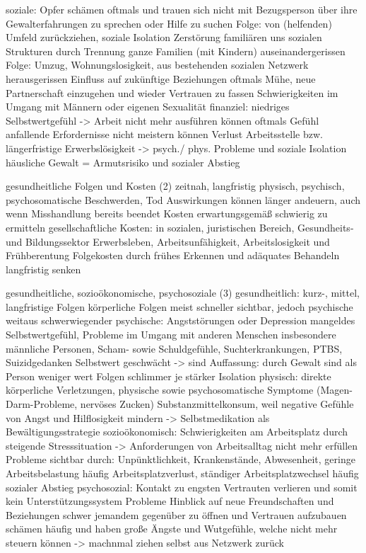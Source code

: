 soziale:
    Opfer schämen oftmals und trauen sich nicht mit Bezugsperson über ihre Gewalterfahrungen zu sprechen oder Hilfe zu suchen
    Folge: von (helfenden) Umfeld zurückziehen, soziale Isolation
    Zerstörung familiären uns sozialen Strukturen
    durch Trennung ganze Familien (mit Kindern) auseinandergerissen
    Folge: Umzug, Wohnungslosigkeit, aus bestehenden sozialen Netzwerk herausgerissen
    Einfluss auf zukünftige Beziehungen
    oftmals Mühe, neue Partnerschaft einzugehen und wieder Vertrauen zu fassen
    Schwierigkeiten im Umgang mit Männern oder eigenen Sexualität
finanziel:
    niedriges Selbstwertgefühl -> Arbeit nicht mehr ausführen können
    oftmals Gefühl anfallende Erfordernisse nicht meistern können
    Verlust Arbeitsstelle bzw. längerfristige Erwerbslösigkeit -> psych./ phys. Probleme und soziale Isolation
    häusliche Gewalt = Armutsrisiko und sozialer Abstieg

gesundheitliche Folgen und Kosten (2)
\parencite{Def_haus_Gewalt}
zeitnah, langfristig
physisch, psychisch, psychosomatische Beschwerden, Tod
Auswirkungen können länger andeuern, auch wenn Misshandlung bereits beendet
Kosten erwartungsgemäß schwierig zu ermitteln
gesellschaftliche Kosten: in sozialen, juristischen Bereich, Gesundheits- und Bildungssektor
Erwerbsleben, Arbeitsunfähigkeit, Arbeitslosigkeit und Frühberentung
Folgekosten durch frühes Erkennen und adäquates Behandeln langfristig senken

gesundheitliche, sozioökonomische, psychosoziale (3)
\parencite{Def_haus_Gewalt_2}
gesundheitlich:
    kurz-, mittel, langfristige Folgen
    körperliche Folgen meist schneller sichtbar, jedoch psychische weitaus schwerwiegender
psychische:
    Angststörungen oder Depression
    mangeldes Selbstwertgefühl, Probleme im Umgang mit anderen Menschen insbesondere männliche Personen, Scham- sowie Schuldgefühle, Suchterkrankungen, PTBS, Suizidgedanken
    Selbstwert geschwächt -> sind Auffassung: durch Gewalt sind als Person weniger wert
    Folgen schlimmer je stärker Isolation
physisch:
    direkte körperliche Verletzungen, physische sowie psychosomatische Symptome (Magen-Darm-Probleme, nervöses Zucken)
    Substanzmittelkonsum, weil negative Gefühle von Angst und Hilflosigkeit mindern -> Selbstmedikation als Bewältigungsstrategie
sozioökonomisch:
    Schwierigkeiten am Arbeitsplatz
    durch steigende Stresssituation -> Anforderungen von Arbeitsalltag nicht mehr erfüllen
    Probleme sichtbar durch: Unpünktlichkeit, Krankenstände, Abwesenheit, geringe Arbeitsbelastung
    häufig Arbeitsplatzverlust, ständiger Arbeitsplatzwechsel
    häufig sozialer Abstieg
psychosozial:
    Kontakt zu engsten Vertrauten verlieren und somit kein Unterstützungssystem
    Probleme Hinblick auf neue Freundschaften und Beziehungen
    schwer jemandem gegenüber zu öffnen und Vertrauen aufzubauen
    schämen häufig und haben große Ängste und Wutgefühle, welche nicht mehr steuern können  -> machnmal ziehen selbst aus Netzwerk zurück

